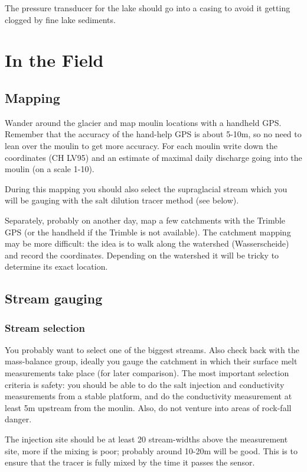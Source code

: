 \documentclass[DIV=15,halfparskip,11pt,headinclude]{scrartcl}
\begin{document}
The pressure transducer for the lake should go into a casing to avoid
it getting clogged by fine lake sediments.

\section{In the Field}
\subsection{Mapping}
\label{sec-1}

Wander around the glacier and map moulin locations with a handheld
GPS.  Remember that the accuracy of the hand-help GPS is about 5-10m,
so no need to lean over the moulin to get more accuracy.  For each
moulin write down the coordinates (CH LV95) and an estimate of maximal
daily discharge going into the moulin (on a scale 1-10).

During this mapping you should also select the supraglacial stream
which you will be gauging with the salt dilution tracer method (see
below).

Separately, probably on another day, map a few catchments with the
Trimble GPS (or the handheld if the Trimble is not available).  The
catchment mapping may be more difficult: the idea is to walk along the
watershed (Wasserscheide) and record the coordinates.  Depending on
the watershed it will be tricky to determine its exact location.

\subsection{Stream gauging}
\label{sec-2}

\subsubsection{Stream selection}
\label{sec-2-1}
You probably want to select one of the biggest streams.  Also check
back with the mass-balance group, ideally you gauge the catchment in
which their surface melt measurements take place (for later
comparison).  The most important selection criteria is safety: you
should be able to do the salt injection and conductivity measurements
from a stable platform, and do the conductivity measurement at least
5m upstream from the moulin.  Also, do not venture into areas of
rock-fall danger.

The injection site should be at least 20 stream-widths above the
measurement site, more if the mixing is poor; probably around 10-20m
will be good.  This is to ensure that the tracer is fully mixed by the
time it passes the sensor.
\end{document}
